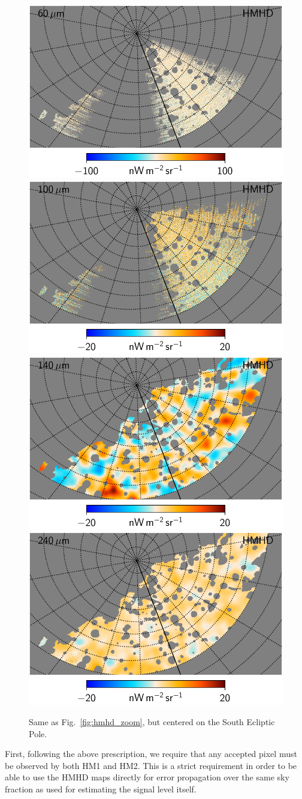 \documentclass{aa}
\begin{document}
\begin{figure}
  \includegraphics[width=0.376\linewidth]{figs/CGDR2_07_hmhd_fullres_v4_south.pdf}\hspace*{5mm}
  \includegraphics[width=0.376\linewidth]{figs/CGDR2_08_hmhd_fullres_v4_south.pdf}\\
  \includegraphics[width=0.376\linewidth]{figs/CGDR2_09_hmhd_fullres_3deg_v4_south.pdf}\hspace*{5mm}
  \includegraphics[width=0.376\linewidth]{figs/CGDR2_10_hmhd_fullres_3deg_v4_south.pdf}
  \caption{Same as Fig.~\ref{fig:hmhd_zoom}, but centered on the South Ecliptic Pole.}
  \label{fig:hmhd_zoom_south}
\end{figure}

First, following the above prescription, we require that any
accepted pixel must be observed by both HM1 and HM2. This is a strict
requirement in order to be able to use the HMHD maps directly for
error propagation over the same sky fraction as used for estimating
the signal level itself. 
\end{document}
